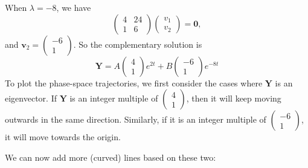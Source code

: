 \documentclass[a4paper]{article}
\begin{document}
\begin{eg}
  When $\lambda = -8$, we have
  \[
    \begin{pmatrix}
      4 & 24\\
      1 & 6
    \end{pmatrix}
    \begin{pmatrix}
      v_1\\v_2
    \end{pmatrix} = \mathbf{0},
  \]
  and $\mathbf{v}_2 =
  \begin{pmatrix}
    -6 \\1
  \end{pmatrix}$. So the complementary solution is
  \[
    \mathbf{Y} = A
    \begin{pmatrix}
      4\\1
    \end{pmatrix}e^{2t} + B
    \begin{pmatrix}
      -6\\1
    \end{pmatrix}e^{-8t}
  \]
  To plot the phase-space trajectories, we first consider the cases where $\mathbf{Y}$ is an eigenvector. If $\mathbf{Y}$ is an integer multiple of $\begin{pmatrix}4\\1\end{pmatrix}$, then it will keep moving outwards in the same direction. Similarly, if it is an integer multiple of $\begin{pmatrix}-6\\1\end{pmatrix}$, it will move towards the origin.
  \begin{center}
  \end{center}
  We can now add more (curved) lines based on these two:
  \begin{center}
\end{center}
\end{eg}
\end{document}
